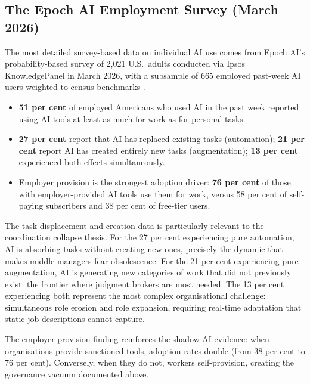 \subsection{The Epoch AI Employment Survey (March 2026)}

The most detailed survey-based data on individual AI use comes from Epoch AI's probability-based survey of 2,021 U.S.\ adults conducted via Ipsos KnowledgePanel in March 2026, with a subsample of 665 employed past-week AI users weighted to census benchmarks \parencite{EpochAI2026}.

\begin{evidencebox}[title={AI as Mainstream Work Tool (Epoch AI, March 2026)}]
\begin{itemize}
  \item \textbf{51 per cent} of employed Americans who used AI in the past week reported using AI tools at least as much for work as for personal tasks.
  \item \textbf{27 per cent} report that AI has replaced existing tasks (automation); \textbf{21 per cent} report AI has created entirely new tasks (augmentation); \textbf{13 per cent} experienced both effects simultaneously.
  \item Employer provision is the strongest adoption driver: \textbf{76 per cent} of those with employer-provided AI tools use them for work, versus 58 per cent of self-paying subscribers and 38 per cent of free-tier users.
\end{itemize}
\end{evidencebox}

The task displacement and creation data is particularly relevant to the coordination collapse thesis. For the 27 per cent experiencing pure automation, AI is absorbing tasks without creating new ones, precisely the dynamic that makes middle managers fear obsolescence. For the 21 per cent experiencing pure augmentation, AI is generating new categories of work that did not previously exist: the frontier where judgment brokers are most needed. The 13 per cent experiencing both represent the most complex organisational challenge: simultaneous role erosion and role expansion, requiring real-time adaptation that static job descriptions cannot capture.

The employer provision finding reinforces the shadow AI evidence: when organisations provide sanctioned tools, adoption rates double (from 38 per cent to 76 per cent). Conversely, when they do not, workers self-provision, creating the governance vacuum documented above.

